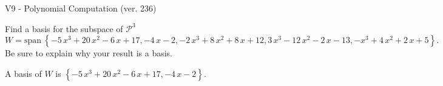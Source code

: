 \begin{exercise}
  \begin{exerciseTitle}V9 - Polynomial Computation (ver. 236)\end{exerciseTitle}
  \begin{exerciseStatement}
    Find a basis for the subspace of \(\mathcal{P}^3\) 
\[W=\mathrm{span}\ \left\{-5 \, x^{3} + 20 \, x^{2} - 6 \, x + 17 , -4 \, x - 2 , -2 \, x^{3} + 8 \, x^{2} + 8 \, x + 12 , 3 \, x^{3} - 12 \, x^{2} - 2 \, x - 13 , -x^{3} + 4 \, x^{2} + 2 \, x + 5\right\}.\]
 Be sure to explain why your result is a basis.


  \end{exerciseStatement}
  \begin{exerciseAnswer}
   A basis of \(W\) is  \(\left\{-5 \, x^{3} + 20 \, x^{2} - 6 \, x + 17 , -4 \, x - 2\right\}\).
  


  \end{exerciseAnswer}
\end{exercise}